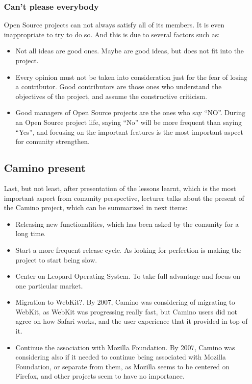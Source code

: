 \documentclass[11pt]{article}
\begin{document}
\subsubsection{Can't please everybody}
Open Source projects can not always satisfy all of its members. It is even inappropriate to try to do so. And this is due to several factors such as:
\begin{itemize}\itemsep0pt
\item{Not all ideas are good ones}. Maybe are good ideas, but does not fit into the project.
\item{Every opinion must not be taken into consideration just for the fear of losing a contributor}. Good contributors are those ones who understand the objectives of the project, and assume the constructive criticism.
\item{Good managers of Open Source projects are the ones who say ``NO''}. During an Open Source project life, saying ``No'' will be more frequent than saying ``Yes'', and focusing on the important features is the most important aspect for comunity strengthen.
\end{itemize}

\subsection{Camino present}
Last, but not least, after presentation of the lessons learnt, which is the most important aspect from comunity perspective, lecturer talks about the present of the Camino project, which can be summarized in next items:
\begin{itemize}\itemsep0pt
\item{Releasing new functionalities}, which has been asked by the comunity for a long time.
\item{Start a more frequent release cycle}. As looking for perfection is making the project to start being slow.
\item{Center on Leopard Operating System}. To take full advantage and focus on one particular market.
\item{Migration to WebKit?}. By 2007, Camino was considering of migrating to WebKit, as WebKit was progressing really fast, but Camino users did not agree on how Safari works, and the user experience that it provided in top of it.
\item{Continue the association with Mozilla Foundation}. By 2007, Camino was considering also if it needed to continue being associated with Mozilla Foundation, or separate from them, as Mozilla seems to be centered on Firefox, and other projects seem to have no importance.
\end{itemize}
\end{document}
